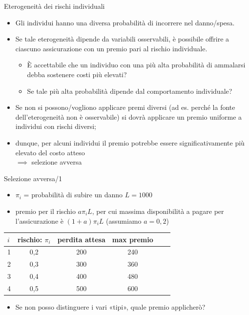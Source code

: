\documentclass[aspectratio=64,12pt]{beamer}
\begin{document}
\begin{frame}{Eterogeneità dei rischi individuali}
\begin{itemize}
\item Gli individui hanno una diversa probabilità di incorrere nel danno/spesa.
\item Se tale eterogeneità dipende da variabili osservabili, è possibile offrire a
ciascuno assicurazione con un premio pari al rischio individuale.
\begin{itemize}
\item È accettabile che un individuo con una più alta probabilità di ammalarsi
  debba sostenere costi più elevati?
\item Se tale più alta probabilità dipende dal comportamento individuale?
\end{itemize}
\item Se non si possono/vogliono applicare premi diversi (ad es. perché la fonte
dell'eterogeneità non è osservabile) si dovrà applicare un premio uniforme a
individui con rischi diversi;
\item dunque, per alcuni individui il premio potrebbe essere
significativamente più elevato del costo atteso\\ $\implies$ \alert{selezione avversa}
\end{itemize}
\end{frame}

\begin{frame}{Selezione avversa/1}
\begin{itemize}
\item $\pi_i$ = probabilità di subire un danno $L=1000$
\item premio per il rischio $a\pi_iL$, per cui massima disponibilità a pagare per
l'assicurazione è $(1+a)\pi_iL$ (assumiamo $a=0,2$)
\end{itemize}

\begin{center}
\begin{tabular}{lccccl}
  \toprule
  $i$&rischio: $\pi_i$&perdita attesa& max premio\\
  \midrule
  1 & 0,2 &200 & 240 \\
  2 & 0,3 &300 & 360 \\
  3 & 0,4 &400 & 480 \\
  4 & 0,5 &500 & 600 \\
  \bottomrule
\end{tabular}  
\end{center}

\begin{itemize}
\item Se non posso distinguere i vari «tipi», quale premio applicherò?
\end{itemize}
\end{frame}
\end{document}
